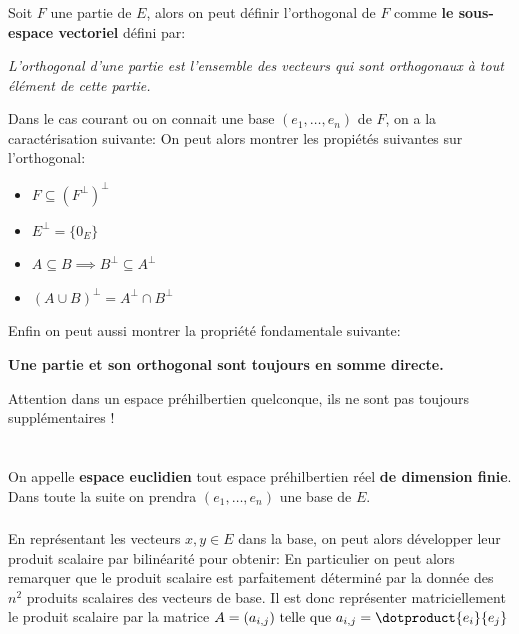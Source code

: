 \subsection*{}
Soit \(F\) une partie de \(E\), alors on peut définir l'orthogonal de \(F\) comme \textbf{le sous-espace vectoriel} défini par:
\begin{center}
   \textit{L'orthogonal d'une partie est l'ensemble des vecteurs qui sont orthogonaux à tout élément de cette partie.}
\end{center}
Dans le cas courant ou on connait une base \((e_1, \ldots, e_n)\) de \(F\), on a la caractérisation suivante:
On peut alors montrer les propiétés suivantes sur l'orthogonal:
\begin{itemize}
   \item \(F \subseteq {(F^\perp)}^\perp\)
   \item \(E^\perp = \{ 0_E \}\)
   \item \(A \subseteq B \implies B^\perp \subseteq A^\perp\)
   \item \((A \cup B)^\perp =  A^\perp \cap B^\perp\)
\end{itemize}
Enfin on peut aussi montrer la propriété fondamentale suivante:
\begin{center}
   \textbf{Une partie et son orthogonal sont toujours en somme directe.}
\end{center}
Attention dans un espace préhilbertien quelconque, ils ne sont pas toujours supplémentaires !

\chapter*{}
On appelle \textbf{espace euclidien} tout espace préhilbertien réel \textbf{de dimension finie}. Dans toute la suite on prendra \((e_1, \ldots, e_n)\) une base de \(E\).

\subsection*{}
En représentant les vecteurs \(x, y \in E\) dans la base, on peut alors développer leur produit scalaire par bilinéarité pour obtenir:
En particulier on peut alors remarquer que le produit scalaire est parfaitement déterminé par la donnée des \(n^2\) produits scalaires des vecteurs de base. Il est donc représenter matriciellement le produit scalaire par la matrice
\(
   A = (a_{i,j}) \text{ telle que } a_{i, j} = \dotproduct{e_i}{e_j}   
\)\<

